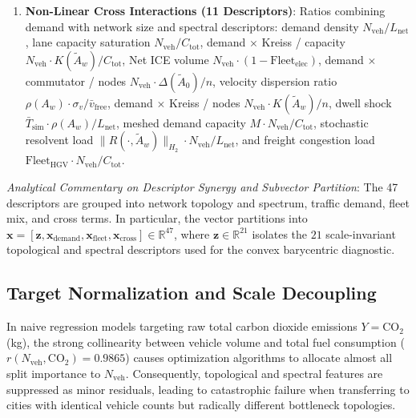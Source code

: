 \documentclass[journal]{IEEEtran}
\begin{document}
\begin{enumerate}
\begin{enumerate}
        \item Discrete Hardy $H_2$ resolvent norms $\|R(\cdot, \tilde{A}_0)\|_{H_2}$ and $\|R(\cdot, \tilde{A}_w)\|_{H_2}$ from \eqref{eq:hardy_lyapunov} (2 descriptors).
        \item $\epsilon$-pseudospectral radii $\alpha_{0.01}(\tilde{A}_0)$ and $\alpha_{0.01}(\tilde{A}_w)$ from \eqref{eq:pseudospectral_radius} (2 descriptors).
        \item Maximum link sensitivity descriptors $S_{\max}(A_0)$ and $S_{\max}(A_w)$ defined in \eqref{eq:max_link_sensitivity} (2 descriptors).
    \end{enumerate}
    \item \textbf{Non-Linear Cross Interactions (11 Descriptors)}: Ratios combining demand with network size and spectral descriptors: demand density $N_{\text{veh}} / L_{\text{net}}$, lane capacity saturation $N_{\text{veh}} / C_{\text{tot}}$, demand $\times$ Kreiss / capacity $N_{\text{veh}} \cdot K(\tilde{A}_w) / C_{\text{tot}}$, Net ICE volume $N_{\text{veh}} \cdot (1 - \text{Fleet}_{\text{elec}})$, demand $\times$ commutator / nodes $N_{\text{veh}} \cdot \Delta(\tilde{A}_0) / n$, velocity dispersion ratio $\rho(A_w) \cdot \sigma_v / \bar{v}_{\text{free}}$, demand $\times$ Kreiss / nodes $N_{\text{veh}} \cdot K(\tilde{A}_w) / n$, dwell shock $\bar{T}_{\text{sim}} \cdot \rho(A_w) / L_{\text{net}}$, meshed demand capacity $M \cdot N_{\text{veh}} / C_{\text{tot}}$, stochastic resolvent load $\|R(\cdot, \tilde{A}_w)\|_{H_2} \cdot N_{\text{veh}} / L_{\text{net}}$, and freight congestion load $\text{Fleet}_{\text{HGV}} \cdot N_{\text{veh}} / C_{\text{tot}}$.
\end{enumerate}

\textit{Analytical Commentary on Descriptor Synergy and Subvector Partition}:
The 47 descriptors are grouped into network topology and spectrum, traffic demand, fleet mix, and cross terms. In particular, the vector partitions into $\mathbf{x} = [\mathbf{z}, \mathbf{x}_{\text{demand}}, \mathbf{x}_{\text{fleet}}, \mathbf{x}_{\text{cross}}] \in \mathbb{R}^{47}$, where $\mathbf{z} \in \mathbb{R}^{21}$ isolates the $21$ scale-invariant topological and spectral descriptors used for the convex barycentric diagnostic.

\subsection{Target Normalization and Scale Decoupling}
In naive regression models targeting raw total carbon dioxide emissions $Y = \text{CO}_2$ (kg), the strong collinearity between vehicle volume and total fuel consumption ($r(N_{\text{veh}}, \text{CO}_2) = 0.9865$) causes optimization algorithms to allocate almost all split importance to $N_{\text{veh}}$. Consequently, topological and spectral features are suppressed as minor residuals, leading to catastrophic failure when transferring to cities with identical vehicle counts but radically different bottleneck topologies.
\end{document}
